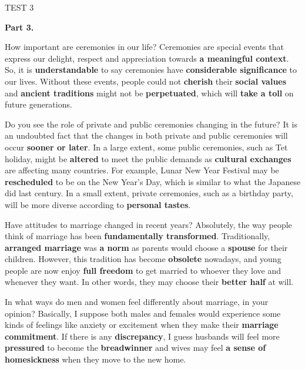 \begin{glossarymc}[Cambridge 3]
\begin{test}{TEST 3}
\begin{VocabExplain}[Part 2]
\end{VocabExplain}
\textbf{Part 3.}

\begin{qa}{How important are ceremonies in our life?}
Ceremonies are special events that express our delight, respect and appreciation towards \textbf{a meaningful context}. So, it is \textbf{understandable} to say ceremonies have \textbf{considerable significance} to our lives. Without these events, people could not \textbf{cherish} their \textbf{social values} and \textbf{ancient traditions} might not be \textbf{perpetuated}, which will \textbf{take a toll} on future generations.
\end{qa}

\begin{qa}{Do you see the role of private and public ceremonies changing in the future?}
It is an undoubted fact that the changes in both private and public ceremonies will occur \textbf{sooner or later}. In a large extent, some public ceremonies, such as Tet holiday, might be \textbf{altered} to meet the public demands as \textbf{cultural exchanges} are affecting many countries. For example, Lunar New Year Festival may be \textbf{rescheduled} to be on the New Year's Day, which is similar to what the Japanese did last century. In a small extent, private ceremonies, such as a birthday party, will be more diverse according to \textbf{personal tastes}.
\end{qa}

\begin{qa}{Have attitudes to marriage changed in recent years?}
Absolutely, the way people think of marriage has been \textbf{fundamentally transformed}. Traditionally, \textbf{arranged marriage} was \textbf{a norm} as parents would choose a \textbf{spouse} for their children. However, this tradition has become \textbf{obsolete} nowadays, and young people are now enjoy \textbf{full freedom} to get married to whoever they love and whenever they want. In other words, they may choose their \textbf{better half} at will.
\end{qa}

\begin{qa}{In what ways do men and women feel differently about marriage, in your opinion?}
Basically, I suppose both males and females would experience some kinds of feelings like anxiety or excitement when they make their \textbf{marriage commitment}. If there is any \textbf{discrepancy}, I guess husbands will feel more \textbf{pressured} to become the \textbf{breadwinner} and wives may feel \textbf{a sense of homesickness} when they move to the new home.
\end{qa}


\end{test}
\end{glossarymc}
